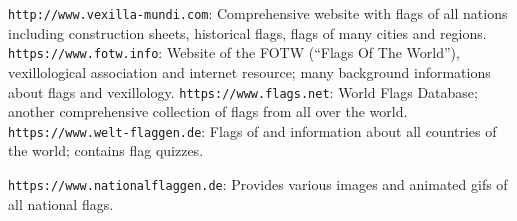 \documentclass[11pt,a4paper,headsepline,fleqn]{scrreprt}
\begin{document}
{
\raggedright
\def\web#1{{\color{emphcolor}\texttt{#1}}: }
\def\txt#1{#1}
\def\bibname{Links}

\begin{thebibliography}{88}
\web{http://www.vexilla-mundi.com}
\txt{Comprehensive website with flags of all nations including construction
     sheets, historical flags, flags of many cities and regions.}
\web{https://www.fotw.info}
\txt{Website of the FOTW (``Flags Of The World''), vexillological association
 and internet resource; many background informations about flags and vexillology.}
\web{https://www.flags.net}
\txt{World Flags Database; another comprehensive collection of flags
from all over the world.}
\web{https://www.welt-flaggen.de}
\txt{Flags of and information about all countries of the world;
contains flag quizzes.}

\web{https://www.nationalflaggen.de}
\txt{Provides various images and animated gifs of all national flags.}
\end{thebibliography}
}
\fi
\end{document}
